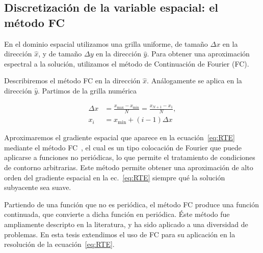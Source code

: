 \subsection{Discretización de la variable espacial: el método FC}
\label{sec:fcmethod}

En el dominio espacial utilizamos una grilla uniforme, 
de tamaño $\Delta x$ en la dirección $\hat x$, y
de tamaño $\Delta y$ en la dirección $\hat y$. 
Para obtener una aproximación espectral a la solución, 
utilizamos el método de Continuación de Fourier (FC). 

Describiremos el método FC en la dirección $\hat x$. 
Análogamente se aplica en la dirección $\hat y$. 
Partimos de la grilla numérica

\begin{equation*}
\begin{aligned}
\Delta x &=\frac{x_{\text{max}}-x_{\text{min}}}{N} = \frac{x_{N+1} - x_1}{N} ,\\
x_i &=x_{\mathrm{min}}+(i-1)\Delta x
\end{aligned}
\end{equation*} 

Aproximaremos el gradiente espacial que aparece 
en la ecuación~\eqref{eq:RTE} mediante el método FC~\cite{Albin2011,Gaggioli2019}, 
el cual es un tipo colocación de Fourier que 
puede aplicarse a funciones no periódicas, lo que permite 
el tratamiento de condiciones de contorno arbitrarias. 
Este método permite obtener una aproximación de alto 
orden del gradiente espacial en la ec.~\eqref{eq:RTE} 
siempre qué la solución subyacente sea suave.

Partiendo de una función que no es periódica, el método FC produce 
una función continuada, que convierte a dicha función en periódica. 
Éste método fue ampliamente descripto en la literatura, y ha sido aplicado 
a una diversidad de problemas. En esta tesis extendimos el uso de FC 
para su aplicación en la resolución de la ecuación~\eqref{eq:RTE}.

